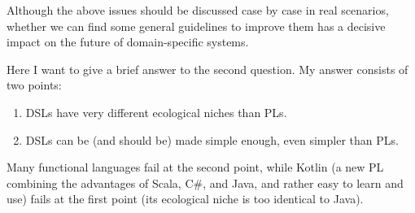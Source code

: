 \documentclass[11pt]{article}
\begin{document}
Although the above issues should be discussed case by case in real scenarios, whether we can find some general guidelines to improve them has a decisive impact on the future of domain-specific systems.

Here I want to give a brief answer to the second question.
My answer consists of two points:
\begin{enumerate}
    \item DSLs have very different ecological niches than PLs.
    \item DSLs can be (and should be) made simple enough, even simpler than PLs.
\end{enumerate}
Many functional languages fail at the second point, while Kotlin (a new PL combining the advantages of Scala, C\#, and Java, and rather easy to learn and use) fails at the first point (its ecological niche is too identical to Java).



\end{document}
